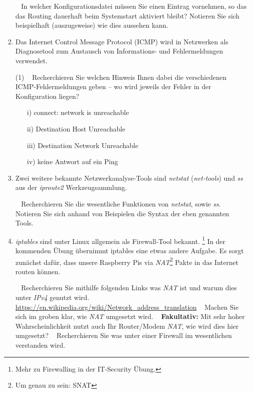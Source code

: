 \documentclass[paper=a4,fontsize=11pt]{scrartcl}%
\numberwithin{equation}{section}
\begin{document}
\begin{enumerate}
\begin{tasks}
	\task~ In welcher Konfigurationsdatei müssen Sie einen Eintrag vornehmen, so das das Routing dauerhaft beim Systemstart aktiviert bleibt? Notieren Sie sich beispielhaft (auszugsweise) wie dies aussehen kann.
	\end{tasks}
	\item Das Internet Control Message Protocol (ICMP) wird in Netzwerken als Diagnosetool zum Austausch von Informations- und Fehlermeldungen verwendet. 
	\begin{tasks}(1)
		\task~ Recherchieren Sie welchen Hinweis Ihnen dabei die verschiedenen ICMP-Fehlermeldungen geben -- wo wird jeweils der Fehler in der Konfiguration liegen?
		\begin{itemize}
			\item[i)] connect: network is unreachable
			\item[ii)] Destination Host Unreachable
			\item[iii)] Destination Network Unreachable
			\item[iv)] keine Antwort auf ein Ping
		\end{itemize}  
	\end{tasks}
	\item Zwei weitere bekannte Netzwerkanalyse-Tools sind \emph{netstat} (\emph{net-tools}) und \emph{ss} aus der \emph{iproute2} Werkzeugsammlung.
	\begin{tasks}
		\task~ Recherchieren Sie die wesentliche Funktionen von \emph{netstat}, sowie \emph{ss}.
		\task~ Notieren Sie sich anhand von Beispielen die Syntax der eben genannten Tools. 
	\end{tasks}
	\item \emph{iptables} sind unter Linux allgemein als Firewall-Tool bekannt. \footnote{Mehr zu Firewalling in der IT-Security Übung.} In der kommenden Übung übernimmt iptables eine etwas andere Aufgabe. Es sorgt zunächst dafür, dass unsere Raspberry Pis via \emph{NAT}\footnote{Um genau zu sein: SNAT} Pakte in das Internet routen können.
	\begin{tasks}
		\task~ Recherchieren Sie mithilfe folgenden Links was \emph{NAT} ist und warum dies unter \emph{IPv4} genutzt wird.\\
		\url{https://en.wikipedia.org/wiki/Network_address_translation}
		\task~ Machen Sie sich im groben klar, wie \emph{NAT} umgesetzt wird. 
		\task~ \textbf{Fakultativ:} Mit sehr hoher Wahrscheinlichkeit nutzt auch Ihr Router/Modem \emph{NAT}, wie wird dies hier umgesetzt?
		\task~ Recherchieren Sie was unter einer Firewall im wesentlichen verstanden wird.

\end{tasks}
\end{enumerate}
\end{document}
